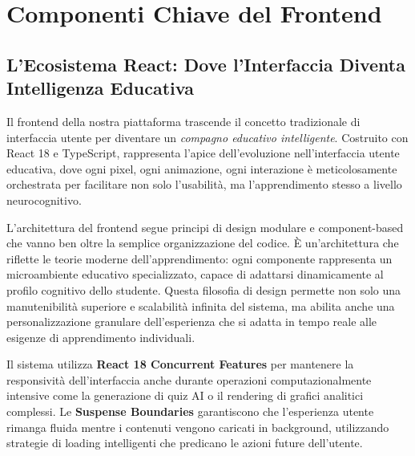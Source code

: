 \documentclass[a4paper, 14pt, oneside]{extbook}
\begin{document}
\section{Componenti Chiave del Frontend}

\subsection{L'Ecosistema React: Dove l'Interfaccia Diventa Intelligenza Educativa}

Il frontend della nostra piattaforma trascende il concetto tradizionale di interfaccia utente per diventare un \textit{compagno educativo intelligente}. Costruito con React 18 e TypeScript, rappresenta l'apice dell'evoluzione nell'interfaccia utente educativa, dove ogni pixel, ogni animazione, ogni interazione è meticolosamente orchestrata per facilitare non solo l'usabilità, ma l'apprendimento stesso a livello neurocognitivo.

L'architettura del frontend segue principi di design modulare e component-based che vanno ben oltre la semplice organizzazione del codice. È un'architettura che riflette le teorie moderne dell'apprendimento: ogni componente rappresenta un microambiente educativo specializzato, capace di adattarsi dinamicamente al profilo cognitivo dello studente. Questa filosofia di design permette non solo una manutenibilità superiore e scalabilità infinita del sistema, ma abilita anche una personalizzazione granulare dell'esperienza che si adatta in tempo reale alle esigenze di apprendimento individuali.

Il sistema utilizza \textbf{React 18 Concurrent Features} per mantenere la responsività dell'interfaccia anche durante operazioni computazionalmente intensive come la generazione di quiz AI o il rendering di grafici analitici complessi. Le \textbf{Suspense Boundaries} garantiscono che l'esperienza utente rimanga fluida mentre i contenuti vengono caricati in background, utilizzando strategie di loading intelligenti che predicano le azioni future dell'utente.
\end{document}

